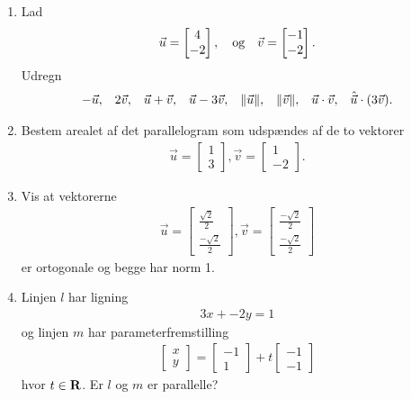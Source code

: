 \begin{enumerate}
	\item Lad 
	\begin{align*}
	\vec{u}=\begin{bmatrix}
	4\\-2
	\end{bmatrix},\quad \textup{og}\quad \vec{v}=\begin{bmatrix}
	-1\\-2
	\end{bmatrix}.
	\end{align*}
	Udregn
	\begin{align*}
	-\vec{u},&&2\vec{v},&&\vec{u}+\vec{v},&&\vec{u}-3\vec{v},&&\Vert \vec{u}\Vert,&&\Vert \vec{v}\Vert,&&\vec{u}\cdot \vec{v},&& \hat{\vec{u}}\cdot (3\vec{v}).
	\end{align*}
	
		\item Bestem arealet af det parallelogram som udspændes af de to vektorer
	\begin{align*}
	\vec{u}=\begin{bmatrix}
	1\\3
	\end{bmatrix},
	\vec{v}=\begin{bmatrix}
	1\\-2
	\end{bmatrix}.
	\end{align*}
	
		
	\item Vis at vektorerne 
	\begin{align*}
	\vec{u}=\begin{bmatrix}
	\frac{\sqrt{2}}{2}\\\frac{-\sqrt{2}}{2}
	\end{bmatrix},
	\vec{v}=\begin{bmatrix}
	\frac{-\sqrt{2}}{2}\\\frac{-\sqrt{2}}{2}
	\end{bmatrix}
	\end{align*}
	er ortogonale og begge har norm 1.
	
	\item Linjen $l$ har ligning 
	\begin{align*}
	3x+-2y=1
	\end{align*}
	og linjen $m$ har parameterfremstilling
	\begin{align*}
	\begin{bmatrix}
	x\\y
	\end{bmatrix}= \begin{bmatrix}
	-1\\1
	\end{bmatrix}+t \begin{bmatrix}
	-1\\-1
	\end{bmatrix}
	\end{align*}
	hvor $t\in \mathbf{R}$. Er $l$ og $m$ er parallelle?
	

\end{enumerate}
